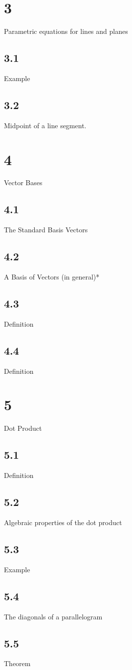 \section{3}{Parametric equations for lines and planes}
\subsection{3.1}{Example}
\subsection{3.2}{Midpoint of a line segment. }
\section{4}{Vector Bases}
\subsection{4.1}{The Standard Basis Vectors}
\subsection{4.2}{A Basis of Vectors (in general)*}
\subsection{4.3}{Definition}
\subsection{4.4}{Definition}
\section{5}{Dot Product}
\subsection{5.1}{Definition}
\subsection{5.2}{Algebraic properties of the dot product}
\subsection{5.3}{Example}
\subsection{5.4}{The diagonals of a parallelogram}
\subsection{5.5}{Theorem}
